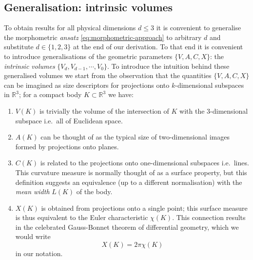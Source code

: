 \subsection{Generalisation: intrinsic volumes}

To obtain results for all physical dimensions $d \le 3$ it is convenient to generalise the morphometric \emph{ansatz} \eqref{eq:morphometric-approach} to arbitrary $d$ and substitute $d \in \{1, 2, 3\}$ at the end of our derivation.
To that end it is convenient to introduce generalisations of the geometric parameters $\{V,A,C,X\}$: the \emph{intrinsic volumes} $\{V_d, V_{d-1}, \cdots, V_0\}$.
To introduce the intuition behind these generalised volumes we start from the observation that the quantities $\{V,A,C,X\}$ can be imagined as size descriptors for projections onto $k$-dimensional subspaces in $\mathbb{R}^3$; for a compact body $K \subset \mathbb{R}^3$ we have:
\begin{enumerate}
\item $V(K)$ is trivially the volume of the intersection of $K$ with the 3-dimensional subspace i.e.\ all of Euclidean space.
\item $A(K)$ can be thought of as the typical size of two-dimensional images formed by projections onto planes.
\item $C(K)$ is related to the projections onto one-dimensional subspaces i.e.\ lines.
  This curvature measure is normally thought of as a surface property, but this definition suggests an equivalence (up to a different normalisation) with the \emph{mean width} $L(K)$ of the body.
\item $X(K)$ is obtained from projections onto a single point; this surface measure is thus equivalent to the Euler characteristic $\chi(K)$.
  This connection results in the celebrated Gauss-Bonnet theorem of differential geometry, which we would write
  \begin{equation*}
    X(K) = 2\pi \chi(K)
  \end{equation*}
  in our notation.
\end{enumerate}

